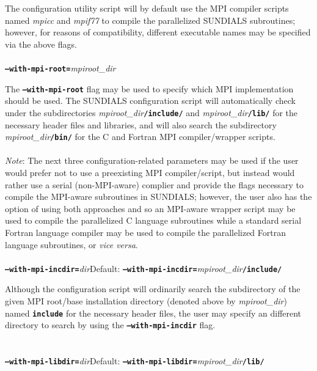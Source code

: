The configuration utility script will by default use the \small MPI \normalsize compiler scripts named \textit{mpicc} and \textit{mpif77} to compile the parallelized \small SUNDIALS \normalsize subroutines; however, for reasons of compatibility, different executable names may be specified via the above flags.
\\
\\
\texttt{\textbf{--with-mpi-root=}}\textit{mpiroot\_dir}\vspace{0.05in}

The \texttt{\textbf{--with-mpi-root}} flag may be used to specify which \small MPI \normalsize implementation should be used.  The \small SUNDIALS \normalsize configuration script will automatically check under the subdirectories \textit{mpiroot\_dir}\texttt{\textbf{/include/}} and \textit{mpiroot\_dir}\texttt{\textbf{/lib/}} for the necessary header files and libraries, and will also search the subdirectory \textit{mpiroot\_dir}\texttt{\textbf{/bin/}} for the C and Fortran \small MPI \normalsize compiler/wrapper scripts.
\\
\\
\textit{Note}: The next three configuration-related parameters may be used if the user would prefer not to use a preexisting \small MPI \normalsize compiler/script, but instead would rather use a serial (non-\small MPI\normalsize-aware) complier and provide the flags necessary to compile the \small MPI\normalsize-aware subroutines in \small SUNDIALS\normalsize ; however, the user also has the option of using both approaches and so an \small MPI\normalsize -aware wrapper script may be used to compile the parallelized C language subroutines while a standard serial Fortran language compiler may be used to compile the parallelized Fortran language subroutines, or \textit{vice versa}.
\\
\\
\texttt{\textbf{--with-mpi-incdir=}}\textit{dir}\hspace{0.5in}Default: \texttt{\textbf{--with-mpi-incdir=}}\textit{mpiroot\_dir}\texttt{\textbf{/include/}}\vspace{0.05in}

Although the configuration script will ordinarily search the subdirectory of the given \small MPI \normalsize root/base installation directory (denoted above by \textit{mpiroot\_dir}) named \texttt{\textbf{include}} for the necessary header files, the user may specify an different directory to search by using the \texttt{\textbf{--with-mpi-incdir}} flag.
\\
\\
\\
\texttt{\textbf{--with-mpi-libdir=}}\textit{dir}\hspace{0.5in}Default: \texttt{\textbf{--with-mpi-libdir=}}\textit{mpiroot\_dir}\texttt{\textbf{/lib/}}\vspace{0.05in}

